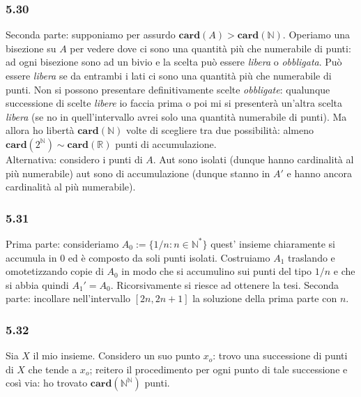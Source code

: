 \documentclass[a4paper,11pt]{article}
\newcommand{\ex}[1]{\subsubsection*{#1}}
\newcommand{\NN}{\mathbb{N}}
\newcommand{\RR}{\mathbb{R}}
\newcommand{\equip}{\sim}
\newcommand{\card}{\mathbf{card}}
\begin{document}
\ex{5.30} Seconda parte: supponiamo per assurdo $\card(A) > \card(\NN)$. Operiamo una bisezione su $A$ per vedere dove ci sono una quantit\`a pi\`u che numerabile di punti: ad ogni bisezione sono ad un bivio e la scelta pu\`o essere {\it libera} o {\it obbligata}. Pu\`o essere {\it libera} se da entrambi i lati ci sono una quantit\`a pi\`u che numerabile di punti. Non si possono presentare definitivamente scelte {\it obbligate}: qualunque successione di scelte {\it libere} io faccia prima o poi mi si presenter\`a un'altra scelta {\it libera} (se no in quell'intervallo avrei solo una quantit\`a numerabile di punti). Ma allora ho libert\`a $\card(\NN)$ volte di scegliere tra due possibilit\`a: almeno $\card(2^{\NN}) \equip \card(\RR)$ punti di accumulazione.\\
Alternativa: considero i punti di $A$. Aut sono isolati (dunque hanno cardinalità al più numerabile) aut sono di accumulazione (dunque stanno in $A'$ e hanno ancora cardinalità al più numerabile). 

\ex{5.31}Prima parte: consideriamo $A_0:=\{1/n:n\in\NN^{*}\}$ quest' insieme chiaramente si accumula in $0$ ed è composto da soli punti isolati. Costruiamo $A_1$ traslando e omotetizzando copie di $A_0$ in modo che si accumulino sui punti del tipo $1/n$ e che si abbia quindi $A_1'=A_0$. Ricorsivamente si riesce ad ottenere la tesi. Seconda parte: incollare nell'intervallo $[2n, 2n+1]$ la soluzione della prima parte con $n$.

\ex{5.32} Sia $X$ il mio insieme. Considero un suo punto $x_o$: trovo una successione di punti di $X$ che tende a $x_o$; reitero il procedimento per ogni punto di tale successione e cos\`i via: ho trovato $\card(\NN^{\NN})$ punti.
\end{document}
